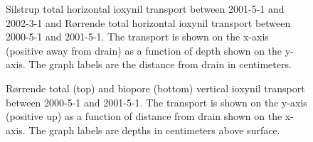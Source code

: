 \begin{figure}[htbp]
  \centering

    
  \caption{Silstrup total horizontal ioxynil transport between 2001-5-1
    and 2002-3-1 and R{\o}rrende total horizontal ioxynil transport between
    2000-5-1 and 2001-5-1. The transport is shown on the x-axis (positive
    away from drain) as a function of depth shown on the y-axis.  The
    graph labels are the distance from drain in centimeters.}
  \label{fig:Ioxynil-horizontal}
\end{figure}


\begin{figure}[htbp]
  \centering
  
  \caption{R{\o}rrende total (top) and biopore (bottom) vertical ioxynil
    transport between 2000-5-1 and 2001-5-1.  The transport is shown on the
    y-axis (positive up) as a function of distance from drain shown on
    the x-axis.  The graph labels are depths in centimeters above
    surface.}
  \label{fig:Rorrende-Ioxynil-2000}
\end{figure}

